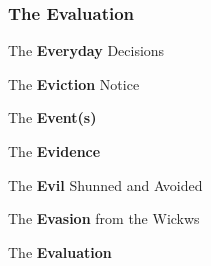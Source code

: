 \subsubsection{The Evaluation}
\begin{compactenum} 
    \item The \textbf{Everyday} Decisions 
    \item The \textbf{Eviction} Notice
    \item The \textbf{Event(s)} 
    \item The \textbf{Evidence} 
    \item The \textbf{Evil} Shunned and Avoided
    \item The \textbf{Evasion} from the Wickws
    \item The \textbf{Evaluation} 
\end{compactenum}

